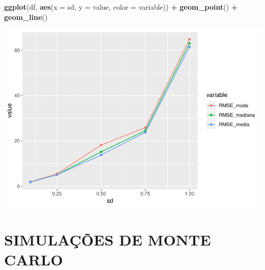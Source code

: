 \documentclass[]{article}
\newenvironment{Shaded}{\begin{snugshade}}{\end{snugshade}}
\newcommand{\KeywordTok}[1]{\textcolor[rgb]{0.13,0.29,0.53}{\textbf{#1}}}
\newcommand{\DataTypeTok}[1]{\textcolor[rgb]{0.13,0.29,0.53}{#1}}
\newcommand{\StringTok}[1]{\textcolor[rgb]{0.31,0.60,0.02}{#1}}
\newcommand{\OperatorTok}[1]{\textcolor[rgb]{0.81,0.36,0.00}{\textbf{#1}}}
\newcommand{\NormalTok}[1]{#1}
\begin{document}
\begin{Shaded}
\begin{Highlighting}[]
\KeywordTok{ggplot}\NormalTok{(df, }\KeywordTok{aes}\NormalTok{(}\DataTypeTok{x =}\NormalTok{ sd, }\DataTypeTok{y =}\NormalTok{ value, }\DataTypeTok{color =}\NormalTok{ variable)) }\OperatorTok{+}\StringTok{ }
\StringTok{  }\KeywordTok{geom_point}\NormalTok{() }\OperatorTok{+}\StringTok{ }\KeywordTok{geom_line}\NormalTok{()}
\end{Highlighting}
\end{Shaded}

\includegraphics{Impacto_sigma_files/figure-latex/unnamed-chunk-45-1.pdf}

\section{SIMULAÇÕES DE MONTE CARLO}\label{simulacoes-de-monte-carlo}
\end{document}
